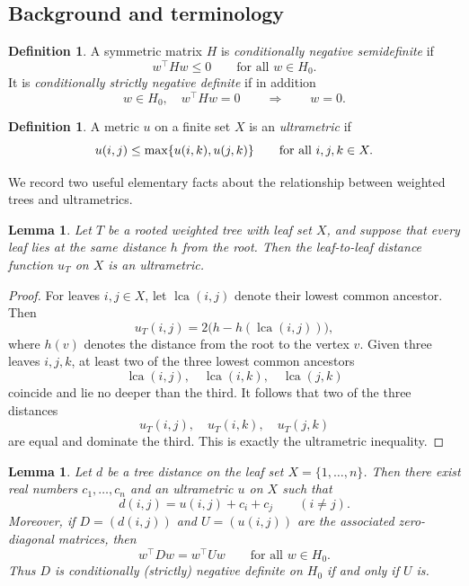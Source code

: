 \documentclass[12pt]{amsart}
\newtheorem{lemma}[theorem]{Lemma}
\theoremstyle{definition}
\newtheorem{definition}[theorem]{Definition}
\newcommand{\1}{\mathbf{1}}
\renewcommand\max{\textup{max}}
\begin{document}
\subsection{Background and terminology}
\label{app:background}

\begin{definition}
A symmetric matrix $H$ is \emph{conditionally negative semidefinite} if
\[
w^\top H w \le 0
\qquad\text{for all } w\in H_0.
\]
It is \emph{conditionally strictly negative definite} if in addition
\[
w\in H_0,
\quad
w^\top H w=0
\qquad\Longrightarrow\qquad
w=0.
\]
\end{definition}

\begin{definition}
A metric $u$ on a finite set $X$ is an \emph{ultrametric} if
\[
u(i,j)\le \max\{u(i,k),u(j,k)\}
\qquad\text{for all } i,j,k\in X.
\]
\end{definition}

We record two useful elementary facts about the relationship between weighted trees and ultrametrics.

\begin{lemma}
\label{lem:equidistant-tree-ultrametric}
Let $T$ be a rooted weighted tree with leaf set $X$, and suppose that every leaf lies
at the same distance $h$ from the root.  Then the leaf-to-leaf distance function
$u_T$ on $X$ is an ultrametric.
\end{lemma}

\begin{proof}
For leaves $i,j\in X$, let $\operatorname{lca}(i,j)$ denote their lowest common
ancestor.  Then
\[
u_T(i,j)=2\bigl(h-h(\operatorname{lca}(i,j))\bigr),
\]
where $h(v)$ denotes the distance from the root to the vertex $v$.  Given three
leaves $i,j,k$, at least two of the three lowest common ancestors
\[
\operatorname{lca}(i,j),\quad
\operatorname{lca}(i,k),\quad
\operatorname{lca}(j,k)
\]
coincide and lie no deeper than the third.  It follows that two of the three distances
\[
u_T(i,j),\quad u_T(i,k),\quad u_T(j,k)
\]
are equal and dominate the third.  This is exactly the ultrametric inequality.
\end{proof}

\begin{lemma}
\label{lem:tree-to-ultrametric}
Let $d$ be a tree distance on the leaf set $X=\{1,\dots,n\}$.  Then there exist real
numbers $c_1,\dots,c_n$ and an ultrametric $u$ on $X$ such that
\[
d(i,j)=u(i,j)+c_i+c_j
\qquad (i\neq j).
\]
Moreover, if $D=(d(i,j))$ and $U=(u(i,j))$ are the associated zero-diagonal
matrices, then
\[
w^\top D w = w^\top U w
\qquad\text{for all } w\in H_0.
\]
Thus $D$ is conditionally (strictly) negative definite on $H_0$ if and only if $U$ is.
\end{lemma}
\end{document}
